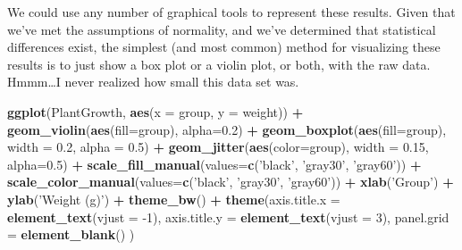 \documentclass[
]{book}
\newenvironment{Shaded}{\begin{snugshade}}{\end{snugshade}}
\newcommand{\DataTypeTok}[1]{\textcolor[rgb]{0.13,0.29,0.53}{#1}}
\newcommand{\DecValTok}[1]{\textcolor[rgb]{0.00,0.00,0.81}{#1}}
\newcommand{\FloatTok}[1]{\textcolor[rgb]{0.00,0.00,0.81}{#1}}
\newcommand{\KeywordTok}[1]{\textcolor[rgb]{0.13,0.29,0.53}{\textbf{#1}}}
\newcommand{\NormalTok}[1]{#1}
\newcommand{\OperatorTok}[1]{\textcolor[rgb]{0.81,0.36,0.00}{\textbf{#1}}}
\newcommand{\StringTok}[1]{\textcolor[rgb]{0.31,0.60,0.02}{#1}}
\begin{document}
We could use any number of graphical tools to represent these results. Given that we've met the assumptions of normality, and we've determined that statistical differences exist, the simplest (and most common) method for visualizing these results is to just show a box plot or a violin plot, or both, with the raw data. Hmmm\ldots I never realized how small this data set was.

\begin{Shaded}
\begin{Highlighting}[]
\KeywordTok{ggplot}\NormalTok{(PlantGrowth, }\KeywordTok{aes}\NormalTok{(}\DataTypeTok{x =}\NormalTok{ group, }\DataTypeTok{y =}\NormalTok{ weight)) }\OperatorTok{+}
\StringTok{  }\KeywordTok{geom_violin}\NormalTok{(}\KeywordTok{aes}\NormalTok{(}\DataTypeTok{fill=}\NormalTok{group), }\DataTypeTok{alpha=}\FloatTok{0.2}\NormalTok{) }\OperatorTok{+}
\StringTok{  }\KeywordTok{geom_boxplot}\NormalTok{(}\KeywordTok{aes}\NormalTok{(}\DataTypeTok{fill=}\NormalTok{group), }\DataTypeTok{width =} \FloatTok{0.2}\NormalTok{, }\DataTypeTok{alpha =} \FloatTok{0.5}\NormalTok{) }\OperatorTok{+}
\StringTok{  }\KeywordTok{geom_jitter}\NormalTok{(}\KeywordTok{aes}\NormalTok{(}\DataTypeTok{color=}\NormalTok{group), }\DataTypeTok{width =} \FloatTok{0.15}\NormalTok{, }\DataTypeTok{alpha=}\FloatTok{0.5}\NormalTok{) }\OperatorTok{+}
\StringTok{  }\KeywordTok{scale_fill_manual}\NormalTok{(}\DataTypeTok{values=}\KeywordTok{c}\NormalTok{(}\StringTok{'black'}\NormalTok{, }\StringTok{'gray30'}\NormalTok{, }\StringTok{'gray60'}\NormalTok{)) }\OperatorTok{+}
\StringTok{  }\KeywordTok{scale_color_manual}\NormalTok{(}\DataTypeTok{values=}\KeywordTok{c}\NormalTok{(}\StringTok{'black'}\NormalTok{, }\StringTok{'gray30'}\NormalTok{, }\StringTok{'gray60'}\NormalTok{)) }\OperatorTok{+}
\StringTok{  }\KeywordTok{xlab}\NormalTok{(}\StringTok{'Group'}\NormalTok{) }\OperatorTok{+}
\StringTok{  }\KeywordTok{ylab}\NormalTok{(}\StringTok{'Weight (g)'}\NormalTok{) }\OperatorTok{+}\StringTok{ }
\StringTok{  }\KeywordTok{theme_bw}\NormalTok{() }\OperatorTok{+}
\StringTok{  }\KeywordTok{theme}\NormalTok{(}\DataTypeTok{axis.title.x =} \KeywordTok{element_text}\NormalTok{(}\DataTypeTok{vjust =} \DecValTok{-1}\NormalTok{),}
        \DataTypeTok{axis.title.y =} \KeywordTok{element_text}\NormalTok{(}\DataTypeTok{vjust =} \DecValTok{3}\NormalTok{),}
        \DataTypeTok{panel.grid =} \KeywordTok{element_blank}\NormalTok{()}
\NormalTok{        )}
\end{Highlighting}
\end{Shaded}
\end{document}
